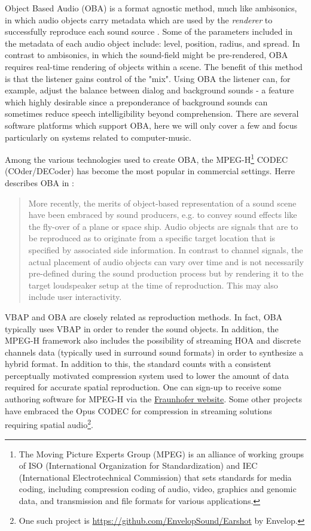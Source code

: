 Object Based Audio (OBA) is a format agnostic method, much like ambisonics, in which audio objects carry metadata which are used by the \textit{renderer} to successfully reproduce each sound source \cite{coleman2018audio}. Some of the parameters included in the metadata of each audio object include: level, position, radius, and spread\cite{fug2014design}. In contrast to ambisonics, in which the sound-field might be pre-rendered, OBA requires real-time rendering of objects within a scene. The benefit of this method is that the listener gains control of the "mix". Using OBA the listener can, for example, adjust the balance between dialog and background sounds - a feature which highly desirable since a preponderance of background sounds can sometimes reduce speech intelligibility beyond comprehension. There are several software platforms which support OBA, here we will only cover a few and focus particularly on systems related to computer-music.

Among the various technologies used to create OBA, the MPEG-H\footnote{The Moving Picture Experts Group (MPEG) is an alliance of working groups of ISO (International Organization for Standardization) and IEC (International Electrotechnical Commission) that sets standards for media coding, including compression coding of audio, video, graphics and genomic data, and transmission and file formats for various applications.} CODEC (COder/DECoder) has become the most popular in commercial settings. Herre describes OBA in \cite{herre2015mpeg}:

\begin{quote}
    More recently, the merits of object-based representation of a sound scene have been embraced by sound producers, e.g. to convey sound effects like the fly-over of a plane or space ship. Audio objects are signals that are to be reproduced as to originate from a specific target location that is specified by associated side information. In contrast to channel signals, the actual placement of audio objects can vary over time and is not necessarily pre-defined during the sound production process but by rendering it to the target loudspeaker setup at the time of reproduction. This may also include user interactivity.
\end{quote}

VBAP and OBA are closely related as reproduction methods. In fact, OBA typically uses VBAP in order to render the sound objects. In addition, the MPEG-H framework also includes the possibility of streaming HOA and discrete channels data (typically used in surround sound formats) in order to synthesize a hybrid format. In addition to this, the standard counts with a consistent perceptually motivated compression system used to lower the amount of data required for accurate spatial reproduction. One can sign-up to receive some authoring software for MPEG-H via the  \href{https://www.iis.fraunhofer.de/en/ff/amm/dl/software/mas.html}{Fraunhofer website}. Some other projects have embraced the Opus CODEC for compression in streaming solutions requiring spatial audio\footnote{One such project is \href{Earshot}{https://github.com/EnvelopSound/Earshot} by Envelop.}.

